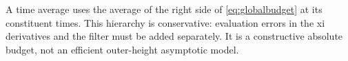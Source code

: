 A time average uses the average of the right side of \eqref{eq:globalbudget}
at its constituent times. This hierarchy is conservative: evaluation errors in the xi derivatives
and the filter must be added separately. It is a constructive absolute
budget, not an efficient outer-height asymptotic model.

